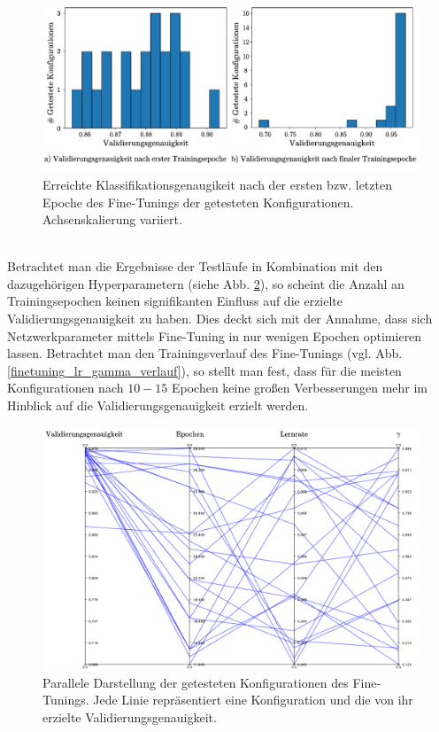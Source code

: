 \begin{figure}[h]
\includegraphics[scale=0.750]{NNOPT/init_and_end_perf_finetuning.pdf}
\caption{Erreichte Klassifikationsgenaugikeit nach der ersten bzw. letzten Epoche des Fine-Tunings der getesteten Konfigurationen. Achsenskalierung variiert.}
\label{finetuning_int_end}
\end{figure}
\\
Betrachtet man die Ergebnisse der Testläufe in Kombination mit den dazugehörigen Hyperparametern (siehe Abb. \ref{finetuning_all}), so scheint die Anzahl an Trainingsepochen keinen signifikanten Einfluss auf die erzielte Validierungsgenauigkeit zu haben. Dies deckt sich mit der Annahme, dass sich Netzwerkparameter mittels Fine-Tuning in nur wenigen Epochen optimieren lassen. Betrachtet man den Trainingsverlauf des Fine-Tunings (vgl. Abb. \ref{finetuning_lr_gamma_verlauf}), so stellt man fest, dass für die meisten Konfigurationen nach $10-15$ Epochen keine großen Verbesserungen mehr im Hinblick auf die Validierungsgenauigkeit erzielt werden.  
\begin{figure}[h]
\includegraphics[scale=0.58]{NNOPT/finetuning_all.pdf}
\caption{Parallele Darstellung der getesteten Konfigurationen des Fine-Tunings. Jede Linie repräsentiert eine Konfiguration und die von ihr erzielte Validierungsgenauigkeit.}
\label{finetuning_all}
\end{figure}
